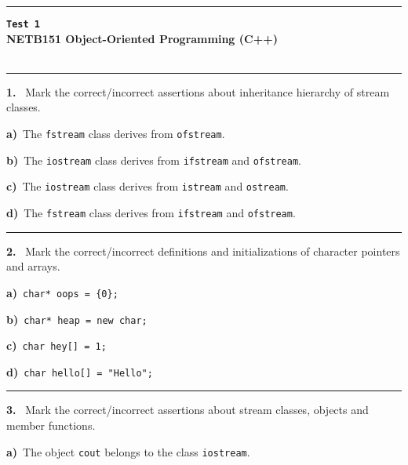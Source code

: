 \newpage\thispagestyle{empty}\par 
\hrule 
\begin{center}
{\bf\large {}}\hfill {\bf\large\verb|Test 1|}
 \hfill{\bf\large {}}\\ 
{\bf\large NETB151 Object-Oriented Programming (C++)}\\[4pt]
{\bf \large {}}\\ 
\end{center}\par
 \vspace{-4mm}
\begin{multicols}{2}
\par\smallskip\hrule\par\medskip

{\bf 1. }\ Mark the correct/incorrect assertions about inheritance
hierarchy of stream classes.

{\bf a)}\ The \verb|fstream| class derives from \verb|ofstream|.

{\bf b)}\ The \verb|iostream| class derives from \verb|ifstream| and \verb|ofstream|.

{\bf c)}\ The \verb|iostream| class derives from \verb|istream| and \verb|ostream|.

{\bf d)}\ The \verb|fstream| class derives from \verb|ifstream| and \verb|ofstream|.

\par\smallskip\hrule\par\medskip

{\bf 2. }\ Mark the correct/incorrect definitions and initializations 
of character pointers and arrays.

{\bf a)}\ \verb|char* oops = {0};|

{\bf b)}\ \verb|char* heap = new char;|

{\bf c)}\ \verb|char hey[] = 1;|

{\bf d)}\ \verb|char hello[] = "Hello";|

\par\smallskip\hrule\par\medskip

{\bf 3. }\ Mark the correct/incorrect assertions about stream classes, objects and
member functions.

{\bf a)}\ The object \verb|cout| belongs to the class \verb|iostream|.


\end{multicols}
